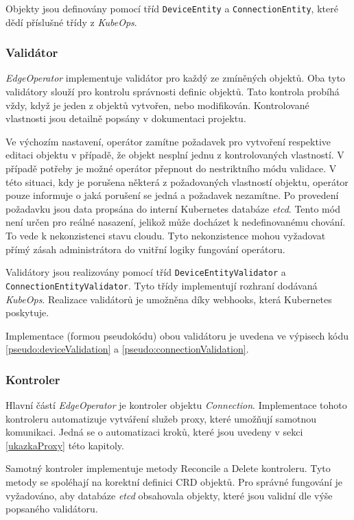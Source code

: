 Objekty jsou definovány pomocí tříd \verb|DeviceEntity| a \verb|ConnectionEntity|, které dědí příslušné třídy z \textit{KubeOps}.

\subsubsection*{Validátor}
\textit{EdgeOperator} implementuje validátor pro každý ze zmíněných objektů. Oba tyto validátory slouží pro kontrolu správnosti definic objektů. Tato kontrola probíhá vždy, když je jeden z objektů vytvořen, nebo modifikován. Kontrolované vlastnosti jsou detailně popsány v dokumentaci projektu. 

Ve výchozím nastavení, operátor zamítne požadavek pro vytvoření respektive editaci objektu v případě, že objekt nesplní jednu z kontrolovaných vlastností. V případě potřeby je možné operátor přepnout do nestriktního módu validace. V této situaci, kdy je porušena některá z požadovaných vlastností objektu, operátor pouze informuje o jaká porušení se jedná a požadavek nezamítne. Po provedení požadavku jsou data propsána do interní Kubernetes databáze \textit{etcd}. Tento mód není určen pro reálné nasazení, jelikož může docházet k nedefinovanému chování. To vede k nekonzistenci stavu cloudu. Tyto nekonzistence mohou vyžadovat přímý zásah administrátora do vnitřní logiky fungování operátoru.

Validátory jsou realizovány pomocí tříd \verb|DeviceEntityValidator| a\\\verb|ConnectionEntityValidator|. Tyto třídy implementují rozhraní dodávaná \textit{KubeOps}. Realizace validátorů je umožněna díky webhooks, která Kubernetes poskytuje.

Implementace (formou pseudokódu) obou validátoru je uvedena ve výpisech kódu \ref{pseudo:deviceValidation} a \ref{pseudo:connectionValidation}.



\subsubsection*{Kontroler}
Hlavní částí \textit{EdgeOperator} je kontroler objektu \textit{Connection}. Implementace tohoto kontroleru automatizuje vytváření služeb proxy, které umožňují samotnou komunikaci. Jedná se o automatizaci kroků, které jsou uvedeny v sekci \ref{ukazkaProxy} této kapitoly.

Samotný kontroler implementuje metody Reconcile a Delete kontroleru. Tyto metody se spoléhají na korektní definici CRD objektů. Pro správné fungování je vyžadováno, aby databáze \textit{etcd} obsahovala objekty, které jsou validní dle výše popsaného validátoru.

